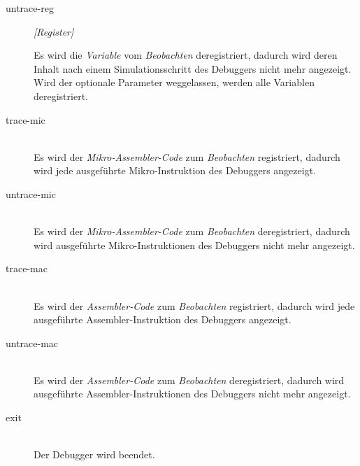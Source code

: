 \begin{description}
\item[untrace-reg] \emph{[Register]}

Es wird die \emph{Variable} vom \emph{Beobachten} deregistriert, dadurch wird deren Inhalt nach einem Simulationsschritt des Debuggers nicht mehr angezeigt. Wird der optionale Parameter weggelassen, werden alle Variablen deregistriert.

\item[trace-mic] \hspace*{\fill}\\

Es wird der \emph{Mikro-Assembler-Code} zum \emph{Beobachten} registriert, dadurch wird jede ausgeführte Mikro-Instruktion des Debuggers angezeigt.

\item[untrace-mic] \hspace*{\fill}\\

Es wird der \emph{Mikro-Assembler-Code} zum \emph{Beobachten} deregistriert, dadurch wird ausgeführte Mikro-Instruktionen des Debuggers nicht mehr angezeigt.

\item[trace-mac] \hspace*{\fill}\\

Es wird der \emph{Assembler-Code} zum \emph{Beobachten} registriert, dadurch wird jede ausgeführte Assembler-Instruktion des Debuggers angezeigt.

\item[untrace-mac] \hspace*{\fill}\\

Es wird der \emph{Assembler-Code} zum \emph{Beobachten} deregistriert, dadurch wird ausgeführte Assembler-Instruktionen des Debuggers nicht mehr angezeigt.

\item[exit] \hspace*{\fill}\\

Der Debugger wird beendet.
\end{description}

